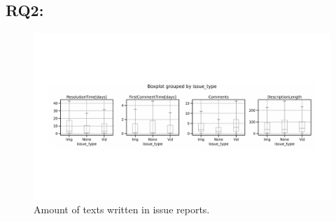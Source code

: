 \subsection*{RQ2: \RQtwo{}}
\begin{figure}[t]
    \centering
    \includegraphics[width=1\linewidth]{./figures/discussions.pdf}
    \caption{Amount of texts written in issue reports. }
    \label{fig:discussion}
\end{figure}

